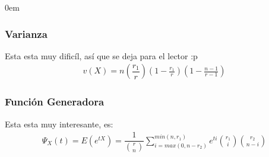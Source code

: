 \documentclass[12pt, fleqn]{report}                             %
\newenvironment{SmallIndentation}[1][0.75em]                    %
        {\begin{adjustwidth}{#1}{}\begin{footnotesize}}             %
        {\end{footnotesize}\end{adjustwidth}}                       %
\theoremstyle{break}                                            %
\newcommand{\Wrap}[1]           {\left( #1 \right)}             %
\newcommand{\pfrac}[2]      {\Wrap{\dfrac{#1}{#2}}}             %
\begin{document}
\begin{multicols}{2}
\begin{SmallIndentation}[0em]
                    \subsubsection{Varianza}

                        Esta esta muy dificíl, así que se deja para el lector :p
                        \begin{align*}
                            v(X) = n \pfrac{r_1}{r} \Wrap{1 - \frac{r_1}{r}} \Wrap{1 - \frac{n - 1}{r - 1}}
                        \end{align*}
                            

                        

                    \subsubsection{Función Generadora}

                        Esta esta muy interesante, es:
                        \begin{align*}
                            \Psi_X(t) 
                                = E( e^{tX} )                 
                                = \dfrac{1}{\binom{r}{n}}                      
                                    \sum_{i = max (0, n - r_2)}^{min(n, r_1)}               
                                       e^{ti} \binom{r_1}{i} \binom{r_2}{n - i}
                        \end{align*}

                \end{SmallIndentation}
                \end{multicols}
\end{document}
